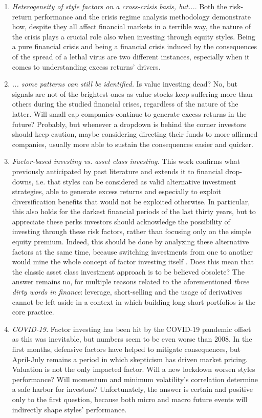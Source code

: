 \documentclass[12pt]{article}
\begin{document}
\begin{enumerate}
\item \textit{Heterogeneity of style factors on a cross-crisis basis, but...}. Both the risk-return performance and the crisis regime analysis methodology demonstrate how, despite they all affect financial markets in a terrible way, the nature of the crisis plays a crucial role also when investing through equity styles. Being a pure financial crisis and being a financial crisis induced by the consequences of the spread of a lethal virus are two different instances, especially when it comes to understanding excess returns' drivers.

\item \textit{... some patterns can still be identified.} Is value investing dead? No, but signals are not of the brightest ones as value stocks keep suffering more than others during the studied financial crises, regardless of the nature of the latter. Will small cap companies continue to generate excess returns in the future? Probably, but whenever a dropdown is behind the corner investors should keep caution, maybe considering directing their funds to more affirmed companies, usually more able to sustain the consequences easier and quicker.

\item \textit{Factor-based investing vs. asset class investing.} This work confirms what previously anticipated by past literature and extends it to financial drop-downs, i.e. that styles can be considered as valid alternative investment strategies, able to generate excess returns and especially to exploit diversification benefits that would not be exploited otherwise. In particular, this also holds for the darkest financial periods of the last thirty years, but to appreciate these perks investors should acknowledge the possibility of investing through these risk factors, rather than focusing only on the simple equity premium. Indeed, this should be done by analyzing these alternative factors at the same time, because switching investments from one to another would mine the whole concept of factor investing itself \cite{asness2015investing}. 
Does this mean that the classic asset class investment approach is to be believed obsolete? The answer remains no, for multiple reasons related to the aforementioned \textit{three dirty words in finance}: leverage, short-selling and the usage of derivatives cannot be left aside in a context in which building long-short portfolios is the core practice.

\item \textit{COVID-19.} Factor investing has been hit by the COVID-19 pandemic offset as this was inevitable, but numbers seem to be even worse than 2008. In the first months, defensive factors have helped to mitigate consequences, but April-July remains a period in which skepticism has driven market pricing. Valuation is not the only impacted factor. Will a new lockdown worsen styles performance? Will momentum and minimum volatility's correlation determine a safe harbor for investors? Unfortunately, the answer is certain and positive only to the first question, because both micro and macro future events will indirectly shape styles' performance.


\end{enumerate}
\end{document}
